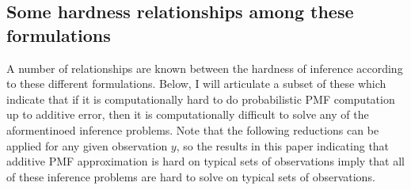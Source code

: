 \documentclass{article}
\theoremstyle{definition}
\theoremstyle{remark}
\begin{document}
\subsection{Some hardness relationships among these formulations} \label{sec:hardness_relationships}

A number of relationships are known between the hardness of inference according to these different formulations.
Below, I will articulate a subset of these which indicate that if it is computationally hard to do 
probabilistic PMF computation up to additive error, then it is computationally difficult to solve any of the aformentinoed inference problems.
Note that the following reductions can be applied for any given observation $y$, so the results in this paper indicating that additive PMF approximation is hard on typical sets of observations imply that all of these inference problems are hard to solve on typical sets of observations.
\end{document}
